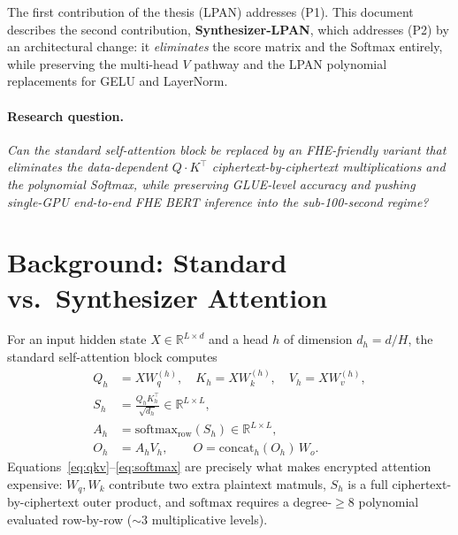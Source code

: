 \documentclass[11pt,a4paper]{article}
\newcommand{\softmax}{\mathrm{softmax}}
\begin{document}
The first contribution of the thesis (LPAN) addresses (P1).  This
document describes the second contribution, \textbf{Synthesizer-LPAN},
which addresses (P2) by an architectural change: it \emph{eliminates}
the score matrix and the Softmax entirely, while preserving the
multi-head $V$ pathway and the LPAN polynomial replacements for GELU
and LayerNorm.

\paragraph{Research question.}
\emph{Can the standard self-attention block be replaced by an
FHE-friendly variant that eliminates the data-dependent
$Q\!\cdot\!K^\top$ ciphertext-by-ciphertext multiplications and the
polynomial Softmax, while preserving GLUE-level accuracy and pushing
single-GPU end-to-end FHE BERT inference into the sub-100-second
regime?}

\section{Background: Standard vs.\ Synthesizer Attention}

For an input hidden state $X \in \mathbb{R}^{L\times d}$ and a head $h$
of dimension $d_h = d/H$, the standard self-attention block computes
\begin{align}
Q_h &= X W_q^{(h)},\quad K_h = X W_k^{(h)},\quad V_h = X W_v^{(h)},
\label{eq:qkv}\\
S_h &= \frac{Q_h K_h^\top}{\sqrt{d_h}} \in \mathbb{R}^{L\times L},
\label{eq:scores}\\
A_h &= \softmax_{\text{row}}(S_h) \in \mathbb{R}^{L\times L},
\label{eq:softmax}\\
O_h &= A_h V_h, \qquad O = \mathrm{concat}_h(O_h)\, W_o.
\label{eq:apply}
\end{align}
Equations~\eqref{eq:qkv}--\eqref{eq:softmax} are precisely what makes
encrypted attention expensive: $W_q, W_k$ contribute two extra plaintext
matmuls, $S_h$ is a full ciphertext-by-ciphertext outer product, and
$\softmax$ requires a degree-$\geq 8$ polynomial evaluated row-by-row
($\sim 3$ multiplicative levels).
\end{document}
